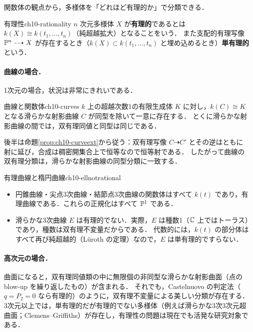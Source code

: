 関数体の観点から，多様体を「どれほど有理的か」で分類できる．

\begin{mydef}{有理性}{ch10-rationality}
$n$ 次元多様体 $X$ が\textbf{有理的}であるとは $k(X)\cong k(t_1,\dots,t_n)$（純超越拡大）となることをいう．
また支配的有理写像 $\mathbb{P}^n\dashrightarrow X$ が存在するとき（$k(X)\subset k(t_1,\dots,t_n)$ と埋め込めるとき）\textbf{単有理的}という．
\end{mydef}

\paragraph{曲線の場合．}
1次元の場合，状況は非常にきれいである．
\begin{mythm}{曲線と関数体}{ch10-curves}
$k$ 上の超越次数1の有限生成体 $K$ に対し，$k(C)\cong K$ となる滑らかな射影曲線 $C$ が同型を除いて一意に存在する．
とくに滑らかな射影曲線の間では，双有理同値と同型は同じである．
\end{mythm}

後半は命題\ref{prop:ch10-curveext}から従う：双有理写像 $C\dashrightarrow C'$ とその逆はともに射に延び，合成は稠密開集合上で恒等なので恒等射である．
したがって曲線の双有理分類は，滑らかな射影曲線の同型分類に一致する．

\begin{myex}{有理曲線と楕円曲線}{ch10-ellnotrational}
\begin{itemize}
  \item 円錐曲線・尖点3次曲線・結節点3次曲線の関数体はすべて $k(t)$ であり，有理曲線である．これらの正規化はすべて $\mathbb{P}^1$ である．
  \item 滑らかな3次曲線 $E$ は有理的でない．実際，$E$ は種数1（$\mathbb{C}$ 上ではトーラス）であり，種数は双有理不変量だからである．
  代数的には，$k(t)$ の部分体はすべて再び純超越的（Lüroth の定理）なので，$E$ は単有理的ですらない．
\end{itemize}
\end{myex}

\paragraph{高次元の場合．}
曲面になると，双有理同値類の中に無限個の非同型な滑らかな射影曲面（点の blow-up を繰り返したもの）が含まれる．
それでも，Castelnuovo の判定法（$q=P_2=0$ なら有理的）のように，双有理不変量による美しい分類が存在する．
3次元以上では，単有理的だが有理的でない多様体（例えば滑らかな3次3次元超曲面；Clemens--Griffiths）が存在し，有理性の問題は現在でも活発な研究対象である．

